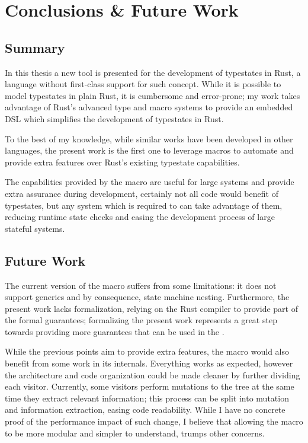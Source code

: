 

\chapter{Conclusions \& Future Work}\label{cha:conclusions}

\section{Summary}

In this thesis a new tool is presented for the development of typestates in Rust,
a language without first-class support for such concept.
While it is possible to model typestates in plain Rust, it is cumbersome and error-prone;
my work takes advantage of Rust's advanced type and macro systems
to provide an embedded DSL which simplifies the development of typestates in Rust.

To the best of my knowledge, while similar works have been developed in other languages,
the present work is the first one to leverage macros to automate
and provide extra features over Rust's existing typestate capabilities.

The capabilities provided by the macro are useful for large systems and provide extra assurance during development,
certainly not all code would benefit of typestates,
but any system which is required to  can take advantage of them,
reducing runtime state checks and easing the development process of large stateful systems.

\section{Future Work}

The current version of the macro suffers from some limitations:
it does not support generics and by consequence, state machine nesting.
Furthermore, the present work lacks formalization, relying on the Rust compiler to provide part of the formal guarantees;
formalizing the present work represents a great step towards providing more guarantees that can be used in the .

While the previous points aim to provide extra features, the macro would also benefit from some work in its internals.
Everything works as expected, however the architecture and code organization could be made cleaner by further dividing each visitor.
Currently, some visitors perform mutations to the tree at the same time they extract relevant information;
this process can be split into mutation and information extraction, easing code readability.
While I have no concrete proof of the performance impact of such change,
I believe that allowing the macro to be more modular and simpler to understand, trumps other concerns.

